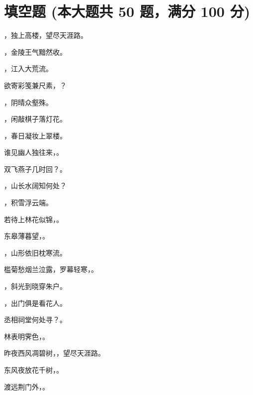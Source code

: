 \documentclass[12pt, a4paper, addpoints]{exam}
\begin{document}
\section{\normalsize{填空题 (本大题共 50 题，满分 100 分)}}
\hspace{1.5cm}
\begin{questions}
\question[2] \uline{\qquad\qquad\qquad\qquad}，独上高楼，望尽天涯路。

\question[2] \uline{\qquad\qquad\qquad\qquad}，金陵王气黯然收。

\question[2] \uline{\qquad\qquad\qquad\qquad}，江入大荒流。

\question[2] 欲寄彩笺兼尺素，\uline{\qquad\qquad\qquad\qquad}？

\question[2] \uline{\qquad\qquad\qquad\qquad}，阴晴众壑殊。

\question[2] \uline{\qquad\qquad\qquad\qquad}，闲敲棋子落灯花。

\question[2] \uline{\qquad\qquad\qquad\qquad}，春日凝妆上翠楼。

\question[2] 谁见幽人独往来，\uline{\qquad\qquad\qquad\qquad}。

\question[2] 双飞燕子几时回？\uline{\qquad\qquad\qquad\qquad}。

\question[2] \uline{\qquad\qquad\qquad\qquad}，山长水阔知何处？

\question[2] \uline{\qquad\qquad\qquad\qquad}，积雪浮云端。

\question[2] 若待上林花似锦，\uline{\qquad\qquad\qquad\qquad}。

\question[2] 东皋薄暮望，\uline{\qquad\qquad\qquad\qquad}。

\question[2] \uline{\qquad\qquad\qquad\qquad}，山形依旧枕寒流。

\question[2] 槛菊愁烟兰泣露，罗幕轻寒，\uline{\qquad\qquad\qquad\qquad}。

\question[2] \uline{\qquad\qquad\qquad\qquad}，斜光到晓穿朱户。

\question[2] \uline{\qquad\qquad\qquad\qquad}，出门俱是看花人。

\question[2] 丞相祠堂何处寻？\uline{\qquad\qquad\qquad\qquad}。

\question[2] 林表明霁色，\uline{\qquad\qquad\qquad\qquad}。

\question[2] 昨夜西风凋碧树，\uline{\qquad\qquad\qquad\qquad}，望尽天涯路。

\question[2] 东风夜放花千树，\uline{\qquad\qquad\qquad\qquad}。

\question[2] 渡远荆门外，\uline{\qquad\qquad\qquad\qquad}。


\end{questions}
\end{document}
